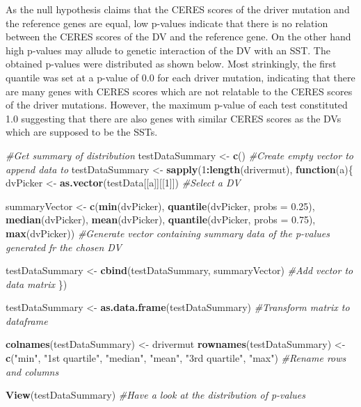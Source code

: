 \documentclass[]{article}
\newenvironment{Shaded}{\begin{snugshade}}{\end{snugshade}}
\newcommand{\CommentTok}[1]{\textcolor[rgb]{0.56,0.35,0.01}{\textit{#1}}}
\newcommand{\ControlFlowTok}[1]{\textcolor[rgb]{0.13,0.29,0.53}{\textbf{#1}}}
\newcommand{\DataTypeTok}[1]{\textcolor[rgb]{0.13,0.29,0.53}{#1}}
\newcommand{\DecValTok}[1]{\textcolor[rgb]{0.00,0.00,0.81}{#1}}
\newcommand{\FloatTok}[1]{\textcolor[rgb]{0.00,0.00,0.81}{#1}}
\newcommand{\KeywordTok}[1]{\textcolor[rgb]{0.13,0.29,0.53}{\textbf{#1}}}
\newcommand{\NormalTok}[1]{#1}
\newcommand{\OperatorTok}[1]{\textcolor[rgb]{0.81,0.36,0.00}{\textbf{#1}}}
\newcommand{\StringTok}[1]{\textcolor[rgb]{0.31,0.60,0.02}{#1}}
\begin{document}
As the null hypothesis claims that the CERES scores of the driver
mutation and the reference genes are equal, low p-values indicate that
there is no relation between the CERES scores of the DV and the
reference gene. On the other hand high p-values may allude to genetic
interaction of the DV with an SST. The obtained p-values were
distributed as shown below. Most strinkingly, the first quantile was set
at a p-value of 0.0 for each driver mutation, indicating that there are
many genes with CERES scores which are not relatable to the CERES scores
of the driver mutations. However, the maximum p-value of each test
constituted 1.0 suggesting that there are also genes with similar CERES
scores as the DVs which are supposed to be the SSTs.

\begin{Shaded}
\begin{Highlighting}[]
\CommentTok{#Get summary of distribution}
\NormalTok{testDataSummary <-}\StringTok{ }\KeywordTok{c}\NormalTok{() }\CommentTok{#Create empty vector to append data to}
\NormalTok{testDataSummary <-}\StringTok{ }\KeywordTok{sapply}\NormalTok{(}\DecValTok{1}\OperatorTok{:}\KeywordTok{length}\NormalTok{(drivermut), }\ControlFlowTok{function}\NormalTok{(a)\{}
\NormalTok{  dvPicker <-}\StringTok{ }\KeywordTok{as.vector}\NormalTok{(testData[[a]][[}\DecValTok{1}\NormalTok{]]) }\CommentTok{#Select a DV}
  
\NormalTok{  summaryVector <-}\StringTok{ }\KeywordTok{c}\NormalTok{(}\KeywordTok{min}\NormalTok{(dvPicker), }\KeywordTok{quantile}\NormalTok{(dvPicker, }\DataTypeTok{probs =} \FloatTok{0.25}\NormalTok{), }\KeywordTok{median}\NormalTok{(dvPicker), }\KeywordTok{mean}\NormalTok{(dvPicker), }\KeywordTok{quantile}\NormalTok{(dvPicker, }\DataTypeTok{probs =} \FloatTok{0.75}\NormalTok{), }\KeywordTok{max}\NormalTok{(dvPicker)) }\CommentTok{#Generate vector containing summary data of the p-values generated fr the chosen DV}
  
\NormalTok{  testDataSummary <-}\StringTok{ }\KeywordTok{cbind}\NormalTok{(testDataSummary, summaryVector) }\CommentTok{#Add vector to data matrix}
\NormalTok{\})}

\NormalTok{testDataSummary <-}\StringTok{ }\KeywordTok{as.data.frame}\NormalTok{(testDataSummary) }\CommentTok{#Transform matrix to dataframe}

\KeywordTok{colnames}\NormalTok{(testDataSummary) <-}\StringTok{ }\NormalTok{drivermut}
\KeywordTok{rownames}\NormalTok{(testDataSummary) <-}\StringTok{ }\KeywordTok{c}\NormalTok{(}\StringTok{"min"}\NormalTok{, }\StringTok{"1st quartile"}\NormalTok{, }\StringTok{"median"}\NormalTok{, }\StringTok{"mean"}\NormalTok{, }\StringTok{"3rd quartile"}\NormalTok{, }\StringTok{"max"}\NormalTok{) }\CommentTok{#Rename rows and columns}

\KeywordTok{View}\NormalTok{(testDataSummary) }\CommentTok{#Have a look at the distribution of p-values}
\end{Highlighting}
\end{Shaded}
\end{document}
